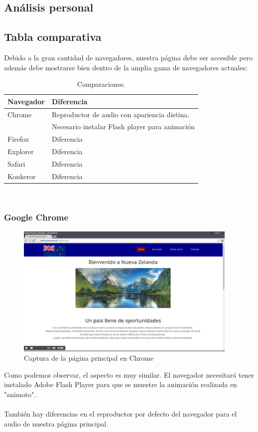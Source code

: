 \subsection{Análisis personal}
\subsection{Tabla comparativa}
Debido a la gran cantidad de navegadores, nuestra página debe ser accesible pero además debe mostrarse bien dentro de la amplia gama de navegadores actuales:\\
\begin{table}[htbp]
	\begin{center}
		\begin{tabular}{|l|l|}
			\hline
			Navegador & Diferencia \\
			\hline \hline
			Chrome & Reproductor de audio con apariencia distina. \\ & Necesario instalar Flash player para animación \\ \hline
			Firefox & Diferencia \\ \hline
			Explorer & Diferencia \\ \hline
			Safari & Diferencia \\ \hline
			Konkeror & Diferencia \\ \hline
		\end{tabular}
		\caption{Comparaciones.}
		\label{tabla:sencilla}
	\end{center}
\end{table}\\
\subsubsection{Google Chrome}

\begin{figure}[h]
	\centering
	\includegraphics[width=0.95\textwidth]{./Fotos/chrome-capture.png}
	\caption{Captura de la página principal en Chrome}
	\label{fig: ejemplo}
\end{figure}
Como podemos observar, el aspecto es muy similar. El navegador necesitará tener instalado Adobe Flash Player para que se muestre la animación realizada en "animoto". \\ \\ También hay diferencias en el reproductor por defecto del navegador para el audio de nuestra página principal.

